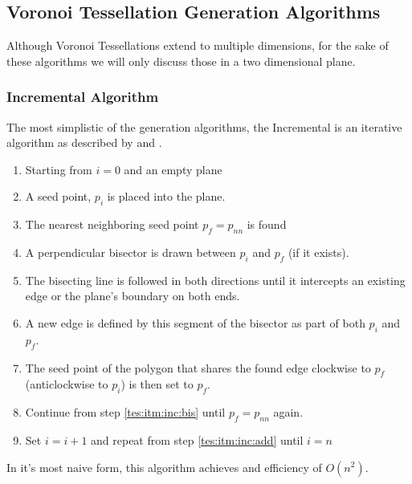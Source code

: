 \subsection{Voronoi Tessellation Generation Algorithms}\label{tes:sec:tga}
Although Voronoi Tessellations extend to multiple dimensions, for the sake of these algorithms we will only discuss those in a two dimensional plane.
%
\subsubsection{Incremental Algorithm}\label{tes:ssec:inc}
The most simplistic of the generation algorithms, the Incremental is an iterative algorithm as described by \cite{green1978computing} and \cite{okabe2009spatial}.
\begin{enumerate}
\item Starting from $i=0$ and an empty plane
\item\label{tes:itm:inc:add} A seed point, $p_i$ is placed into the plane.
\item The nearest neighboring seed point $p_f=p_{nn}$ is found
\item\label{tes:itm:inc:bis} A perpendicular bisector is drawn between $p_i$ and $p_f$ (if it exists).
\item The bisecting line is followed in both directions until it intercepts an existing edge or the plane's boundary on both ends.
\item A new edge is defined by this segment of the bisector as part of both $p_i$ and $p_f$.
\item The seed point of the polygon that shares the found edge clockwise to $p_f$ (anticlockwise to $p_i$) is then set to $p_f$.
\item Continue from step \ref{tes:itm:inc:bis} until $p_f=p_{nn}$ again.
\item Set $i = i +1$ and repeat from step \ref{tes:itm:inc:add} until $i=n$
\end{enumerate}
In it's most naive form, this algorithm achieves and efficiency of $O(n^2)$.
%
